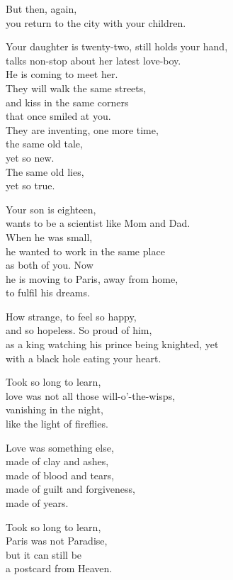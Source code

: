 \documentclass[12pt,twoside]{article}
\newcounter{scounter}
\newcommand\step{\stepcounter{scounter}\Roman{scounter}}
\begin{document}
\poemtitle{\step} 
\begin{poem}
\begin{stanza}
But then, again,\\
you return to the city with your children.
\end{stanza}
\begin{stanza}
Your daughter is twenty-two, still holds your hand,\\
talks non-stop about her latest love-boy.\\
He is coming to meet her.\\
They will walk the same streets,\\
and kiss in the same corners\\
that once smiled at you.\\
They are inventing, one more time,\\
the same old tale,\\
yet so new.\\
The same old lies,\\
yet so true.
\end{stanza}
\begin{stanza}
Your son is eighteen,\\
wants to be a scientist like Mom and Dad.\\
When he was small,\\
he wanted to work in the same place\\
as both of you. Now\\
he is moving to Paris, away from home,\\
to fulfil his dreams.
\end{stanza}
\begin{stanza}
How strange, to feel so happy,\\
and so hopeless. So proud of him,\\
as a king watching his prince being knighted, yet\\
with a black hole eating your heart.
\end{stanza}
\begin{stanza}
Took so long to learn,\\
love was not all those will-o'-the-wisps,\\
vanishing in the night,\\
like the light of fireflies.
\end{stanza}
\begin{stanza}
Love was something else,\\
made of clay and ashes,\\
made of blood and tears,\\
made of guilt and forgiveness,\\
made of years.
\end{stanza}
\begin{stanza}
Took so long to learn,\\
Paris was not Paradise,\\
but it can still be\\
a postcard from Heaven.
\end{stanza}
\end{poem}
\end{document}
